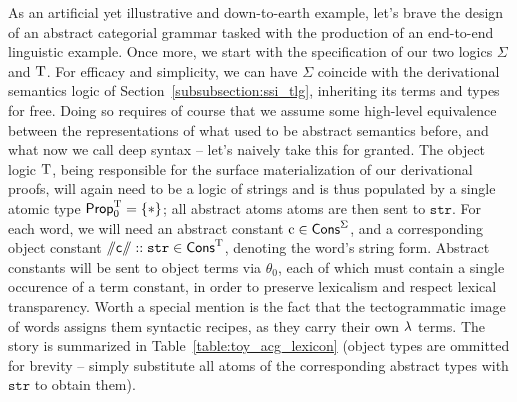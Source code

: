 As an artificial yet illustrative and down-to-earth example, let's brave the design of an abstract categorial grammar tasked with the production of an end-to-end linguistic example.
Once more, we start with the specification of our two logics $\Sigma$ and $\mathrm{T}$.
For efficacy and simplicity, we can have $\Sigma$ coincide with the derivational semantics logic of Section~\ref{subsubsection:ssi_tlg}, inheriting its terms and types for free.
Doing so requires of course that we assume some high-level equivalence between the representations of what used to be abstract semantics before, and what now we call deep syntax -- let's naively take this for granted.
The object logic $\mathrm{T}$, being responsible for the surface materialization of our derivational proofs, will again need to be a logic of strings and is thus populated by a single atomic type $\mathsf{Prop}_0^{\mathrm{T}} = \{ *\}$; all abstract atoms atoms are then sent to $\mathtt{str}$.
For each word, we will need an abstract constant $\text{c} \in \mathsf{Cons}^{\Sigma}$, and a corresponding object constant $\mathsf{\sslash{c}\sslash} :: \mathtt{str} \in \mathsf{Cons}^{\mathrm{T}}$, denoting the word's string form. 
Abstract constants will be sent to object terms via $\theta_0$, each of which must contain a single occurence of a term constant, in order to preserve lexicalism and respect lexical transparency.
Worth a special mention is the fact that the tectogrammatic image of words assigns them syntactic recipes, as they carry their own $\mathnormal{\lambda}$ terms.
The story is summarized in Table~\ref{table:toy_acg_lexicon} (object types are ommitted for brevity -- simply substitute all atoms of the corresponding abstract types with $\mathtt{str}$ to obtain them).

